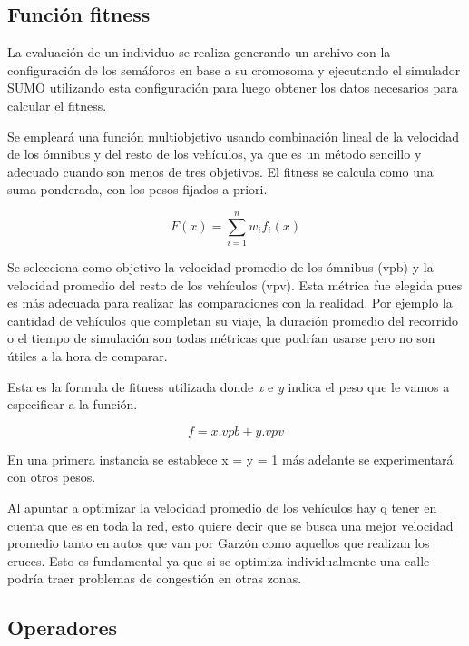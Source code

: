 \subsection{Función fitness}


La evaluación de un individuo se realiza generando un archivo con la configuración de los semáforos en base a su cromosoma y ejecutando el simulador SUMO utilizando esta configuración para luego obtener los datos necesarios para calcular el fitness.

Se empleará una función multiobjetivo usando combinación lineal de la velocidad de los ómnibus y del resto de los vehículos, ya que es un método sencillo y adecuado cuando son menos de tres objetivos. El fitness se calcula como una suma ponderada, con los pesos fijados a priori.

        \begin{equation}
        \label{eq:funcion_fitness_generica}
		F(x) = \sum_{i=1}^{n}{w_i}{f_i}(x)
        \end{equation}

Se selecciona como objetivo la velocidad promedio de los ómnibus (vpb) y la velocidad promedio del resto de los vehículos (vpv). Esta métrica fue elegida pues es más adecuada para realizar las comparaciones con la realidad. Por ejemplo la cantidad de vehículos que completan su viaje, la duración promedio del recorrido o el tiempo de simulación son todas métricas que podrían usarse pero no son útiles a la hora de comparar.

Esta es la formula de fitness utilizada donde \emph{x} e \emph{y} indica el peso que le vamos a especificar a la función. 

        \begin{equation}
        \label{eq:funcion_fitness}
        f = x.vpb + y.vpv
        \end{equation}
        
En una primera instancia se establece x = y = 1 más adelante se experimentará con otros pesos.

Al apuntar a optimizar la velocidad promedio de los vehículos hay q tener en cuenta que es en toda la red, esto quiere decir que se busca una mejor velocidad promedio tanto en autos que van por Garzón como aquellos que realizan los cruces. Esto es fundamental ya que si se optimiza individualmente una calle podría traer problemas de congestión en otras zonas.

\subsection{Operadores}

